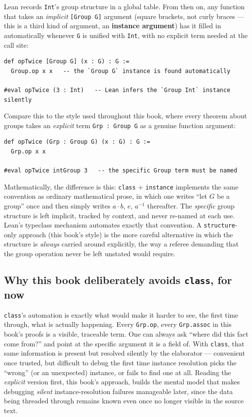 Lean records \texttt{Int}'s group structure in a global table. From then on, any function that takes an \emph{implicit} \texttt{[Group G]} argument (square brackets, not curly braces --- this is a third kind of argument, an \textbf{instance argument}) has it filled in automatically whenever \texttt{G} is unified with \texttt{Int}, with no explicit term needed at the call site:

\begin{lstlisting}
def opTwice [Group G] (x : G) : G :=
  Group.op x x   -- the `Group G` instance is found automatically

#eval opTwice (3 : Int)   -- Lean infers the `Group Int` instance silently
\end{lstlisting}

Compare this to the style used throughout this book, where every theorem about groups takes an \emph{explicit} term \texttt{Grp : Group G} as a genuine function argument:

\begin{lstlisting}
def opTwice (Grp : Group G) (x : G) : G :=
  Grp.op x x

#eval opTwice intGroup 3   -- the specific Group term must be named
\end{lstlisting}

Mathematically, the difference is this: \texttt{class} + \texttt{instance} implements the same convention as ordinary mathematical prose, in which one writes ``let \(G\) be a group'' once and then simply writes \(a \cdot b\), \(e\), \(a^{-1}\) thereafter. The \emph{specific} group structure is left implicit, tracked by context, and never re-named at each use. Lean's typeclass mechanism automates exactly that convention. A \texttt{structure}-only approach (this book's style) is the more careful alternative in which the structure is \emph{always} carried around explicitly, the way a referee demanding that the group operation never be left unstated would require.

\subsection{\texorpdfstring{Why this book deliberately avoids \texttt{class}, for now}{Why this book deliberately avoids class, for now}}\label{sec:05-rigor-check:01-structure-vs-class:3}

\texttt{class}'s automation is exactly what would make it harder to see, the first time through, what is actually happening. Every \texttt{Grp.op}, every \texttt{Grp.assoc} in this book's proofs is a visible, traceable term. One can always ask ``where did this fact come from?'' and point at the specific argument it is a field of. With \texttt{class}, that same information is present but resolved silently by the elaborator --- convenient once trusted, but difficult to debug the first time instance resolution picks the ``wrong'' (or an unexpected) instance, or fails to find one at all. Reading the \emph{explicit} version first, this book's approach, builds the mental model that makes debugging \emph{silent} instance-resolution failures manageable later, since the data being threaded through remains known even once no longer visible in the source text.

